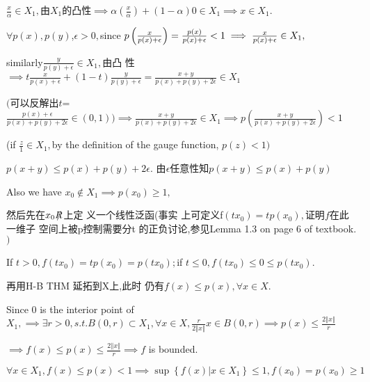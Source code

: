 \documentclass{article}
\begin{document}
$\frac{x}{\alpha }\in X_{1},$由$X_{1}$的凸性$%
\implies \alpha \left( \frac{x}{\alpha }\right) +\left( 1-\alpha \right)
0\in X_{1}\implies x\in X_{1}.$

$\forall p\left( x\right) ,p\left( y\right) $,$\epsilon >0,$since $p\left( 
\frac{x}{p\left( x\right) +\epsilon }\right) =\frac{p\left( x\right) }{%
p\left( x\right) +\epsilon }<1\implies \frac{x}{p\left( x\right) +\epsilon }%
\in X_{1},$

similarly$\frac{y}{p\left( y\right) +\epsilon }\in X_{1},$由凸%
性$\implies t\frac{x}{p\left( x\right) +\epsilon }+\left( 1-t\right) 
\frac{y}{p\left( y\right) +\epsilon }=\frac{x+y}{p\left( x\right) +p\left(
y\right) +2\epsilon }\in X_{1}$

$($可以反解出$t$=$\frac{p\left( x\right)
+\epsilon }{p\left( x\right) +p\left( y\right) +2\epsilon }\in \left(
0,1\right) )\implies \frac{x+y}{p\left( x\right) +p\left( y\right)
+2\epsilon }\in X_{1}\implies p\left( \frac{x+y}{p\left( x\right) +p\left(
y\right) +2\epsilon }\right) <1$

(if $\frac{z}{1}\in X_{1},$by the definition of the gauge function, $p\left(
z\right) <1)$

$p\left( x+y\right) \leq p\left( x\right) +p\left( y\right) +2\epsilon .$%
由$\epsilon $任意性知$p\left( x+y\right) \leq
p\left( x\right) +p\left( y\right) $

Also we have $x_{0}\notin X_{1}\implies p\left( x_{0}\right) \geq 1,$

\bigskip 然后先在$x_{0}\NEG{R}$上定%
义一个线性泛函(事实%
上可定义f$\left( tx_{0}\right) =tp\left(
x_{0}\right) ,$证明$f$在此一维子%
空间上被p控制需要分t%
的正负讨论,参见Lemma 1.3 on page 6
of textbook.$)$

If $t>0,f\left( tx_{0}\right) =tp\left( x_{0}\right) =p\left( tx_{0}\right)
; $if $t\leq 0,f\left( tx_{0}\right) \leq 0\leq p\left( tx_{0}\right) .$

再用H-B THM 延拓到X上,此时%
仍有$f(x)\leq p\left( x\right) ,\forall x\in X$.

Since $0$ is the interior point of $X_{1},\implies \exists r>0,s.t.B\left(
0,r\right) \subset X_{1},\forall x\in X,\frac{r}{2\left\Vert x\right\Vert }%
x\in B\left( 0,r\right) \implies p\left( x\right) \leq \frac{2\left\Vert
x\right\Vert }{r}$

$\implies f\left( x\right) \leq p\left( x\right) \leq \frac{2\left\Vert
x\right\Vert }{r}\implies f$ is bounded.

\bigskip $\forall x\in X_{1},f\left( x\right) \leq p\left( x\right)
<1\implies \sup \left\{ f\left( x\right) |x\in X_{1}\right\} \leq 1,f\left(
x_{0}\right) =p\left( x_{0}\right) \geq 1$
\end{document}
